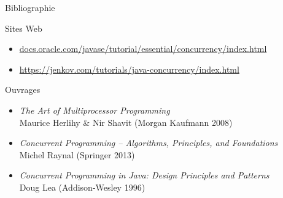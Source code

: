 
\begingroup

\begin{frame}{Bibliographie}

  \vfill

  \begin{block}{Sites Web}
    \begin{itemize}
    \item \href{http://docs.oracle.com/javase/tutorial/essential/concurrency/index.html}{docs.oracle.com/javase/tutorial/essential/concurrency/index.html}
    \item \href{https://jenkov.com/tutorials/java-concurrency/index.html}{https://jenkov.com/tutorials/java-concurrency/index.html}
    \end{itemize}
  \end{block}

  \vfill

  \begin{block}{Ouvrages}
    \begin{itemize}
    \item \textit{The Art of Multiprocessor Programming}\\ Maurice Herlihy \& Nir Shavit (Morgan Kaufmann 2008)
    \item \textit{Concurrent Programming -- Algorithms, Principles, and Foundations}\\ Michel Raynal (Springer 2013)
    \item \textit{Concurrent Programming in Java: Design Principles and Patterns}\\ Doug Lea (Addison-Wesley 1996)
    \end{itemize}
  \end{block}
  
  \vfill
  
  
\end{frame}

\endgroup
\endinput
